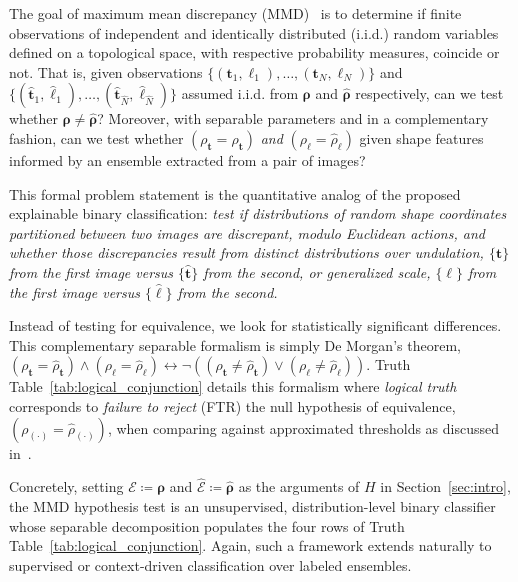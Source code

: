 \documentclass[pdflatex,iicol]{sn-jnl}%
\theoremstyle{thmstyleone}%
\theoremstyle{thmstyletwo}%
\theoremstyle{thmstylethree}%
\begin{document}
The goal of maximum mean discrepancy (MMD)~\cite{fortet1953convergence,gretton2012kernel} is to determine if finite observations of independent and identically distributed (i.i.d.) random variables defined on a topological space, with respective probability measures, coincide or not. That is, given observations $\lbrace (\boldsymbol{t}_1, \boldsymbol{\ell}_1),\dots,(\boldsymbol{t}_N, \boldsymbol{\ell}_N)\rbrace$ and $\lbrace (\widehat{\boldsymbol{t}}_1, \widehat{\boldsymbol{\ell}}_1),\dots,(\widehat{\boldsymbol{t}}_{\widehat{N}}, \widehat{\boldsymbol{\ell}}_{\widehat{N}}) \rbrace$ assumed i.i.d. from $\boldsymbol{\rho}$ and $\widehat{\boldsymbol{\rho}}$ respectively, can we test whether $\boldsymbol{\rho} \neq \widehat{\boldsymbol{\rho}}$? Moreover, with separable parameters and in a complementary fashion, can we test whether $(\rho_{\boldsymbol{t}} = \widehat{\rho}_{\boldsymbol{t}})$ \emph{and} $(\rho_{\boldsymbol{\ell}} = \widehat{\rho}_{\boldsymbol{\ell}})$ given shape features informed by an ensemble extracted from a pair of images? 

This formal problem statement is the quantitative analog of the proposed explainable binary classification: \textit{test if distributions of random shape coordinates partitioned between two images are discrepant, modulo Euclidean actions, and whether those discrepancies result from distinct distributions over undulation, $\lbrace \boldsymbol{t} \rbrace$ from the first image versus $\lbrace \widehat{\boldsymbol{t}} \rbrace$ from the second, \emph{or} generalized scale, $\lbrace \boldsymbol{\ell} \rbrace$ from the first image versus $\lbrace \widehat{\boldsymbol{\ell}} \rbrace$ from the second.}

Instead of testing for equivalence, we look for statistically significant differences. This complementary separable formalism is simply De Morgan's theorem, $(\rho_{\boldsymbol{t}} = \widehat{\rho}_{\boldsymbol{t}})\wedge (\rho_{\boldsymbol{\ell}} = \widehat{\rho}_{\boldsymbol{\ell}}) \leftrightarrow \neg ((\rho_{\boldsymbol{t}} \neq \widehat{\rho}_{\boldsymbol{t}}) \vee (\rho_{\boldsymbol{\ell}} \neq \widehat{\rho}_{\boldsymbol{\ell}}))$. Truth Table~\ref{tab:logical_conjunction} details this formalism where \textit{logical truth} corresponds to \textit{failure to reject} (FTR) the null hypothesis of equivalence, $(\rho_{(\cdot)} = \widehat{\rho}_{(\cdot)})$, when comparing against approximated thresholds as discussed in~\cite{gretton2012kernel}.

Concretely, setting $\mathcal{E}\coloneqq\boldsymbol{\rho}$ and $\widehat{\mathcal{E}}\coloneqq\widehat{\boldsymbol{\rho}}$ as the arguments of $H$ in Section~\ref{sec:intro}, the MMD hypothesis test is an unsupervised, distribution-level binary classifier whose separable decomposition populates the four rows of Truth Table~\ref{tab:logical_conjunction}. Again, such a framework extends naturally to supervised or context-driven classification over labeled ensembles.
\end{document}
